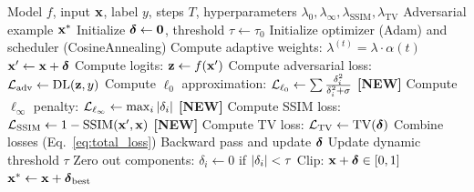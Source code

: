 \begin{algorithm}[t]
    \caption{Perceptually-Aware $\sigma$-zero}
    \label{alg:perceptual_sigmazero}
    \begin{algorithmic}[1]
        \REQUIRE Model $f$, input $\mathbf{x}$, label $y$, steps $T$, hyperparameters $\lambda_0, \lambda_\infty, \lambda_{\text{SSIM}}, \lambda_{\text{TV}}$
        \ENSURE Adversarial example $\mathbf{x}^*$
        \STATE Initialize $\boldsymbol{\delta} \leftarrow \mathbf{0}$, threshold $\tau \leftarrow \tau_0$
        \STATE Initialize optimizer (Adam) and scheduler (CosineAnnealing)
            \STATE Compute adaptive weights: $\lambda^{(t)} = \lambda \cdot \alpha(t)$
            \STATE $\mathbf{x}' \leftarrow \mathbf{x} + \boldsymbol{\delta}$
            \STATE Compute logits: $\mathbf{z} \leftarrow f(\mathbf{x}')$
            \STATE Compute adversarial loss: ${\cal L}_{\text{adv}} \leftarrow \text{DL}(\mathbf{z}, y)$
            \STATE Compute $\ell_0$ approximation: ${\cal L}_{\ell_0} \leftarrow \sum \frac{\delta_i^2}{\delta_i^2 + \sigma}$
            \STATE \textbf{[NEW]} Compute $\ell_\infty$ penalty: ${\cal L}_{\ell_\infty} \leftarrow \max_i \left|\delta_i\right|$
            \STATE \textbf{[NEW]} Compute SSIM loss: ${\cal L}_{\text{SSIM}} \leftarrow 1 - \text{SSIM}(\mathbf{x}', \mathbf{x})$
            \STATE \textbf{[NEW]} Compute TV loss: ${\cal L}_{\text{TV}} \leftarrow \text{TV}(\boldsymbol{\delta})$
            \STATE Combine losses (Eq.~\ref{eq:total_loss})
            \STATE Backward pass and update $\boldsymbol{\delta}$
            \STATE Update dynamic threshold $\tau$
            \STATE Zero out components: $\delta_i \leftarrow 0$ if $\left|\delta_i\right| < \tau$
            \STATE Clip: $\mathbf{x} + \boldsymbol{\delta} \in [0, 1]$
        \ENDFOR
        \RETURN $\mathbf{x}^* \leftarrow \mathbf{x} + \boldsymbol{\delta}_{\text{best}}$
    \end{algorithmic}
\end{algorithm}

